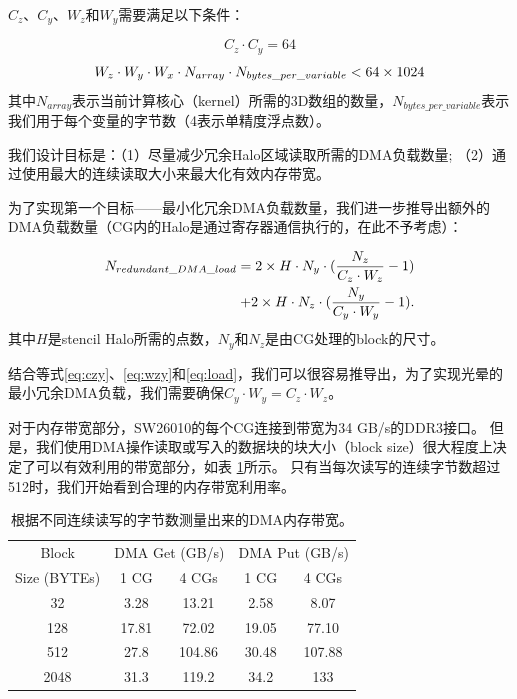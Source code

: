 \documentclass[degree=doctor]{thuthesis}
\begin{document}
$C_z$、$C_y$、$W_z$和$W_y$需要满足以下条件：

\begin{equation}
C_z \cdot C_y = 64
\label{eq:czy}
\end{equation}
\begin{equation}
W_z \cdot W_y \cdot W_x \cdot N_{array} \cdot N_{bytes\_per\_variable} < 64 \times 1024\\
\label{eq:wzy}
\end{equation}
其中$ N_{array} $表示当前计算核心（kernel）所需的3D数组的数量，$N_{bytes\_per\_variable}$表示我们用于每个变量的字节数（4表示单精度浮点数）。

我们设计目标是：（1）尽量减少冗余Halo区域读取所需的DMA负载数量; （2）通过使用最大的连续读取大小来最大化有效内存带宽。

为了实现第一个目标——最小化冗余DMA负载数量，我们进一步推导出额外的DMA负载数量（CG内的Halo是通过寄存器通信执行的，在此不予考虑）：

\begin{eqnarray}
N_{redundant\_DMA\_load} = 2 \times H \cdot N_y \cdot (\frac{N_z}{C_z\cdot W_z}-1) \notag \\
+ 2 \times H \cdot N_z \cdot (\frac{N_y}{C_y\cdot W_y}-1).
\label{eq:load}
\end{eqnarray}
其中$ H $是stencil Halo所需的点数，$ N_y $和$ N_z $是由CG处理的block的尺寸。

结合等式\ref{eq:czy}、\ref{eq:wzy}和\ref{eq:load}，我们可以很容易推导出，为了实现光晕的最小冗余DMA负载，我们需要确保$C_y\cdot W_y = C_z\cdot W_z $。

对于内存带宽部分，SW26010的每个CG连接到带宽为34 GB/s的DDR3接口。 但是，我们使用DMA操作读取或写入的数据块的块大小（block size）很大程度上决定了可以有效利用的带宽部分，如表 \ref{tb:sw-bw}所示。 只有当每次读写的连续字节数超过512时，我们开始看到合理的内存带宽利用率。

\begin{table}[!t]
\small
\caption{根据不同连续读写的字节数测量出来的DMA内存带宽。}
\label{tb:sw-bw}
\centering
\begin{tabular}{ccccc}
\hline\hline
  Block & \multicolumn{2}{c}{DMA Get (GB/s)} & \multicolumn{2}{c}{DMA Put (GB/s)} \\
  Size (BYTEs) & 1 CG & 4 CGs & 1 CG & 4 CGs \\\hline
  32 & 3.28 & 13.21 & 2.58 & 8.07 \\
  128 & 17.81 & 72.02 & 19.05 & 77.10 \\
  512 & 27.8 & 104.86 & 30.48 & 107.88 \\
  2048 & 31.3 & 119.2 & 34.2 & 133 \\
  \hline
\end{tabular}
\end{table}
\end{document}
